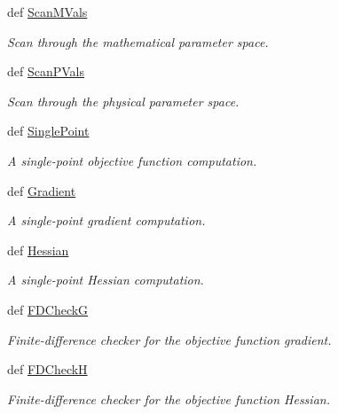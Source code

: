 \begin{DoxyCompactItemize}
def \hyperlink{classforcebalance_1_1optimizer_1_1Optimizer_a43ab8c6bea2b3112468922ab61163f67}{Scan\-M\-Vals}
\begin{DoxyCompactList}\small\item\em Scan through the mathematical parameter space. \end{DoxyCompactList}\item 
def \hyperlink{classforcebalance_1_1optimizer_1_1Optimizer_a70bff76f2e56d87c8dee8aa92fe56d29}{Scan\-P\-Vals}
\begin{DoxyCompactList}\small\item\em Scan through the physical parameter space. \end{DoxyCompactList}\item 
def \hyperlink{classforcebalance_1_1optimizer_1_1Optimizer_a1477d2b88faa1d4991418538133abcff}{Single\-Point}
\begin{DoxyCompactList}\small\item\em A single-\/point objective function computation. \end{DoxyCompactList}\item 
def \hyperlink{classforcebalance_1_1optimizer_1_1Optimizer_ac5adf24cf3ea3976eb67f75b6b89d101}{Gradient}
\begin{DoxyCompactList}\small\item\em A single-\/point gradient computation. \end{DoxyCompactList}\item 
def \hyperlink{classforcebalance_1_1optimizer_1_1Optimizer_a0c16ad8678a6480e235a45d69fb077d3}{Hessian}
\begin{DoxyCompactList}\small\item\em A single-\/point Hessian computation. \end{DoxyCompactList}\item 
def \hyperlink{classforcebalance_1_1optimizer_1_1Optimizer_aacf96d137fb0e491af7e380c8bd61eb9}{F\-D\-Check\-G}
\begin{DoxyCompactList}\small\item\em Finite-\/difference checker for the objective function gradient. \end{DoxyCompactList}\item 
def \hyperlink{classforcebalance_1_1optimizer_1_1Optimizer_adb86c1f6580bb088a23563a6103986fe}{F\-D\-Check\-H}
\begin{DoxyCompactList}\small\item\em Finite-\/difference checker for the objective function Hessian. \end{DoxyCompactList}\item 

\end{DoxyCompactItemize}
